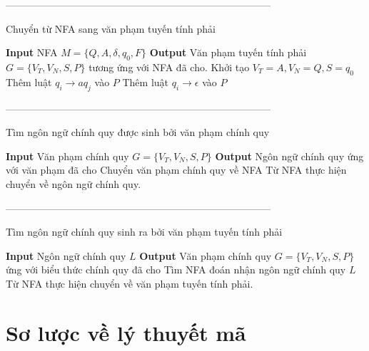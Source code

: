 \documentclass[14pt]{extreport}
\begin{document}
--------------------------------------------------------------------------------\\
\begin{algorithm}[H]
\caption{Chuyển từ NFA sang văn phạm tuyến tính phải}
\begin{algorithmic} 
\STATE \textbf{Input} NFA $M = \{Q, A, \delta, q_0, F\}$
\STATE \textbf{Output} Văn phạm tuyến tính phải $G = \{V_T, V_N, S, P\}$ tương ứng với NFA đã cho.
\STATE Khởi tạo $V_T = A, V_N = Q, S = q_0$
\STATE Thêm luật $q_i \rightarrow aq_j$ vào $P$
\ENDFOR
\ENDFOR
\ENDFOR
{}
\STATE Thêm luật $q_i \rightarrow \epsilon$ vào $P$
\ENDFOR
\end{algorithmic}
\end{algorithm}

--------------------------------------------------------------------------------\\
\begin{algorithm}[H]
\caption{Tìm ngôn ngữ chính quy được sinh bởi văn phạm chính quy}
\begin{algorithmic} 
\STATE \textbf{Input} Văn phạm chính quy $G = \{V_T, V_N, S, P\}$
\STATE \textbf{Output} Ngôn ngữ chính quy ứng với văn phạm đã cho
\STATE Chuyển văn phạm chính quy về NFA
\STATE Từ NFA thực hiện chuyển về ngôn ngữ chính quy.
\end{algorithmic}
\end{algorithm}

--------------------------------------------------------------------------------\\
\begin{algorithm}[H]
\caption{Tìm ngôn ngữ chính quy sinh ra bởi văn phạm tuyến tính phải}
\begin{algorithmic} 
\STATE \textbf{Input} Ngôn ngữ chính quy $L$
\STATE \textbf{Output} Văn phạm chính quy $G = \{V_T, V_N, S, P\}$ ứng với biểu thức chính quy đã cho
\STATE Tìm NFA đoán nhận ngôn ngữ chính quy $L$
\STATE Từ NFA thực hiện chuyển về văn phạm tuyến tính phải.
\end{algorithmic}
\end{algorithm}

\chapter{Sơ lược về lý thuyết mã}
\end{document}
